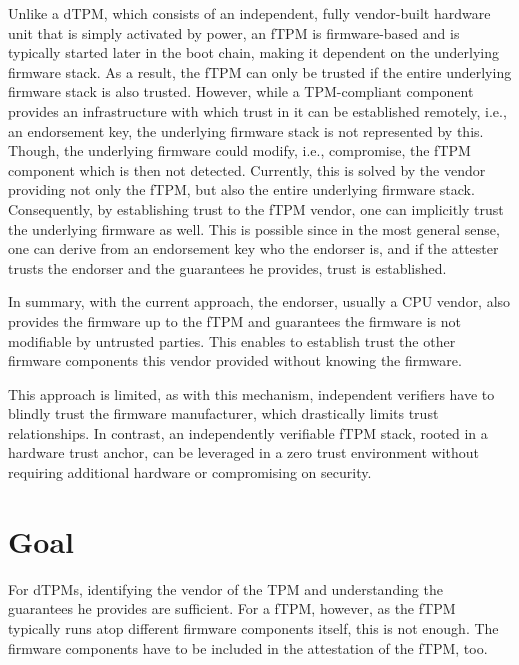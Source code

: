 
Unlike a dTPM, which consists of an independent, fully vendor-built hardware unit that is simply activated by power, an \ac{fTPM} is firmware-based and is typically started later in the boot chain, making it dependent on the underlying firmware stack.
As a result, the fTPM can only be trusted if the entire underlying firmware stack is also trusted.
However, while a TPM-compliant component provides an infrastructure with which trust in it can be established remotely, i.e., an endorsement key, the underlying firmware stack is not represented by this.
Though, the underlying firmware could modify, i.e., compromise, the fTPM component which is then not detected.
Currently, this is solved by the vendor providing not only the fTPM, but also the entire underlying firmware stack.
Consequently, by establishing trust to the fTPM vendor, one can implicitly trust the underlying firmware as well.
This is possible since in the most general sense, one can derive from an endorsement key who the endorser is, and if the attester trusts the endorser and the guarantees he provides, trust is established.


In summary, with the current approach, the endorser, usually a CPU vendor, also provides the firmware up to the fTPM and guarantees the firmware is not modifiable by untrusted parties. This enables to establish trust the other firmware components this vendor provided without knowing the firmware.


This approach is limited, as with this mechanism, independent verifiers have to blindly trust the firmware manufacturer, which drastically limits trust relationships.
In contrast, an independently verifiable fTPM stack, rooted in a hardware trust anchor, can be leveraged in a zero trust environment without requiring additional hardware or compromising on security.

\section{Goal}

For \acp{dTPM}, identifying the vendor of the TPM and understanding the guarantees he provides are sufficient. For a fTPM, however, as the fTPM typically runs atop different firmware components itself, this is not enough. The firmware components have to be included in the attestation of the fTPM, too.

